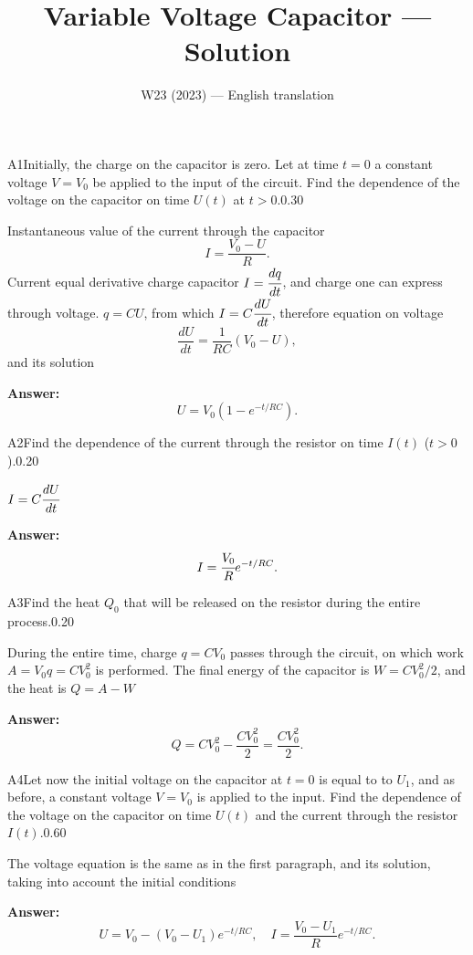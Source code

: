 \documentclass[11pt,a4paper]{article}
\title{\textbf{Variable Voltage Capacitor --- Solution}}
\author{\normalsize W23 (2023) — English translation}
\date{}
\begin{document}
\maketitle\vspace{-0.5em}
\begin{solcard}{A1}{Initially, the charge on the capacitor is zero. Let at time $t  = 0$ a constant voltage $V = V_0$ be applied to the input of the circuit. Find the dependence of the voltage on the capacitor on time $U(t)$ at $t > 0$.}{0.30}

Instantaneous value of the current through the capacitor $$ I = \frac{V_0 - U}{R}. $$ Current equal derivative charge capacitor $I = \cfrac{dq}{dt}$, and charge one can express through voltage. $q = CU$, from which $I = C\cfrac{dU}{dt}$, therefore equation on voltage $$ \frac{dU}{dt} = \frac{1}{RC} \left( V_0 -U\right), $$ and its solution

\par\smallskip\noindent\textbf{Answer:} $$ U = V_0 \left( 1 - e^{-t/RC}\right). $$
\end{solcard}

\begin{solcard}{A2}{Find the dependence of the current through the resistor on time $I(t)$ ($t > 0$).}{0.20}

$I = C\cfrac{dU}{dt}$

\par\smallskip\noindent\textbf{Answer:} $$ I = \cfrac{V_0}{R} e^{-t/RC}. $$
\end{solcard}

\begin{solcard}{A3}{Find the heat $Q_0$ that will be released on the resistor during the entire process.}{0.20}

During the entire time, charge $q= CV_0$ passes through the circuit, on which work $A=V_0 q = CV_0^2$ is performed. The final energy of the capacitor is $W = CV_0^2/2$, and the heat is $Q = A - W$

\par\smallskip\noindent\textbf{Answer:} $$ Q = CV_0^2 - \frac{C V_0^2}{2} = \frac{C V_0^2}{2}. $$
\end{solcard}

\begin{solcard}{A4}{Let now the initial voltage on the capacitor at $t = 0$ is equal to to $U_1$, and as before, a constant voltage $V = V_0$ is applied to the input. Find the dependence of the voltage on the capacitor on time $U(t)$ and the current through the resistor $I(t)$.}{0.60}

The voltage equation is the same as in the first paragraph, and its solution, taking into account the initial conditions

\par\smallskip\noindent\textbf{Answer:} $$ U = V_0 - (V_0 - U_1) e^{-t/RC}, \quad I = \frac{V_0 - U_1}{R}e^{-t/RC}. $$
\end{solcard}
\end{document}
